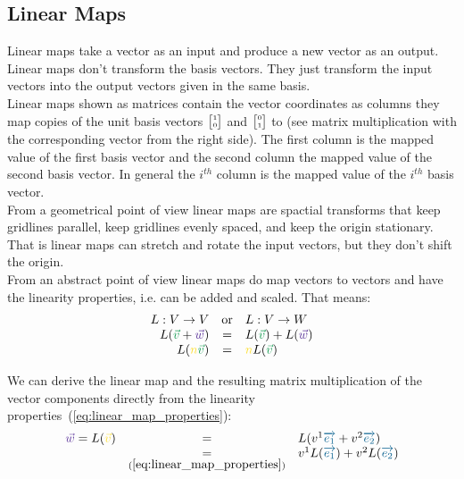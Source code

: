 \subsection{Linear Maps}

Linear maps take a vector as an input and produce a new vector as an output. Linear maps
don't transform the basis vectors. They just transform the input vectors into the output
vectors given in the same basis.\\

Linear maps shown as matrices contain the vector coordinates as columns they map copies of
the unit basis vectors ${\tiny\begin{bmatrix} 1 \\ 0\end{bmatrix}}$ and
${\tiny\begin{bmatrix} 0 \\ 1 \end{bmatrix}}$ to (see matrix multiplication with the
corresponding vector from the right side). The first column is the mapped value of the
first basis vector and the second column the mapped value of the second basis vector. In
general the $i^{th}$ column is the mapped value of the $i^{th}$ basis vector.\\

From a geometrical point of view linear maps are spactial transforms that keep gridlines
parallel, keep gridlines evenly spaced, and keep the origin stationary. That is linear
maps can stretch and rotate the input vectors, but they don't shift the origin.\\

From an abstract point of view linear maps do map vectors to vectors and have the
linearity properties, i.e. can be added and scaled. That means:
\begin{equation}
    \label{eq:linear_map_properties}
    \begin{array}{rcl}
        L: V \rightarrow  V &\text{or}& L: V \rightarrow W \\
        L(\textcolor{ForestGreen}{\vec{v}} + \textcolor{RoyalPurple}{\vec{w}}) & = &
        L(\textcolor{ForestGreen}{\vec{v}}) + L(\textcolor{RoyalPurple}{\vec{w}}) \\
        L(\textcolor{Goldenrod}{n}\textcolor{ForestGreen}{\vec{v}}) & = &
        \textcolor{Goldenrod}{n}L(\textcolor{ForestGreen}{\vec{v}}) 
    \end{array}
\end{equation}

We can derive the linear map and the resulting matrix multiplication of the vector
components directly from the linearity properties~(\ref{eq:linear_map_properties}):
\begin{equation}
    \label{eq:linear_map_derive_matrix_multiplication}
    \begin{array}{rcl}
        \textcolor{RoyalPurple}{\vec{w}} = L(\textcolor{Goldenrod}{\vec{v}}) & = &
        L(\hdvc{1}\hdbv{1} + \hdvc{2}\hdbv{2}) \\
        & \underset{(\ref{eq:linear_map_properties})}{=} &
        \hdvc{1}L(\hdbv{1}) + \hdvc{2}L(\hdbv{2})
    \end{array}
\end{equation}

